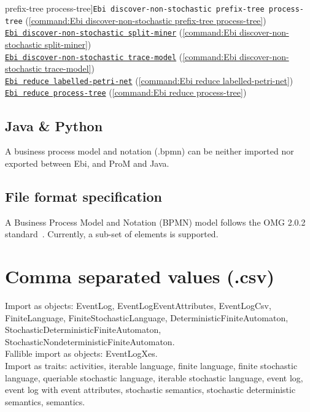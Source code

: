 {prefix-tree process-tree]{\texttt{Ebi discover-non-stochastic prefix-tree process-tree}} (\cref{command:Ebi discover-non-stochastic prefix-tree process-tree})\\\null\qquad\hyperref[command:Ebi discover-non-stochastic split-miner]{\texttt{Ebi discover-non-stochastic split-miner}} (\cref{command:Ebi discover-non-stochastic split-miner})\\\null\qquad\hyperref[command:Ebi discover-non-stochastic trace-model]{\texttt{Ebi discover-non-stochastic trace-model}} (\cref{command:Ebi discover-non-stochastic trace-model})\\\null\qquad\hyperref[command:Ebi reduce labelled-petri-net]{\texttt{Ebi reduce labelled-petri-net}} (\cref{command:Ebi reduce labelled-petri-net})\\\null\qquad\hyperref[command:Ebi reduce process-tree]{\texttt{Ebi reduce process-tree}} (\cref{command:Ebi reduce process-tree})
\subsection*{Java \& Python}
A business process model and notation (.bpmn) can be neither imported nor exported between Ebi, and ProM and Java.
\subsection*{File format specification}A Business Process Model and Notation (BPMN) model follows the OMG 2.0.2 standard~\cite{omg2011bpmn}.
    Currently, a sub-set of elements is supported.
\clearpage
\section{Comma separated values (.csv)}
\label{filehandler:comma-separated values}
Import as objects: EventLog, EventLogEventAttributes, EventLogCsv, FiniteLanguage, FiniteStochasticLanguage, DeterministicFiniteAutomaton, StochasticDeterministicFiniteAutomaton, StochasticNondeterministicFiniteAutomaton.
\\Fallible import as objects: EventLogXes.
\\Import as traits: activities, iterable language, finite language, finite stochastic language, queriable stochastic language, iterable stochastic language, event log, event log with event attributes, stochastic semantics, stochastic deterministic semantics, semantics.
}
